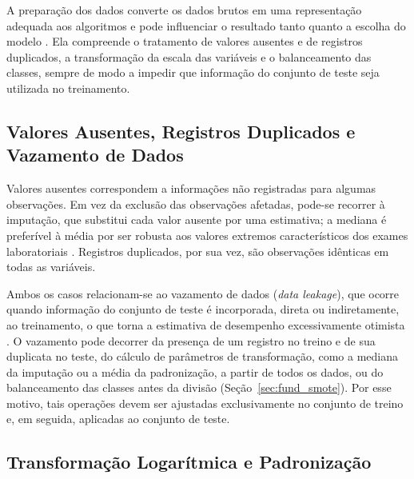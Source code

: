 A preparação dos dados converte os dados brutos em uma representação adequada aos algoritmos e pode influenciar o resultado tanto quanto a escolha do modelo \cite{KAPOOR2023100804}. Ela compreende o tratamento de valores ausentes e de registros duplicados, a transformação da escala das variáveis e o balanceamento das classes, sempre de modo a impedir que informação do conjunto de teste seja utilizada no treinamento.

\subsection{Valores Ausentes, Registros Duplicados e Vazamento de Dados}
\label{sec:fund_ausentes}
\label{sec:fund_vazamento}

Valores ausentes correspondem a informações não registradas para algumas observações. Em vez da exclusão das observações afetadas, pode-se recorrer à imputação, que substitui cada valor ausente por uma estimativa; a mediana é preferível à média por ser robusta aos valores extremos característicos dos exames laboratoriais \cite{batistamonard2003}. Registros duplicados, por sua vez, são observações idênticas em todas as variáveis.

Ambos os casos relacionam-se ao vazamento de dados (\textit{data leakage}), que ocorre quando informação do conjunto de teste é incorporada, direta ou indiretamente, ao treinamento, o que torna a estimativa de desempenho excessivamente otimista \cite{KaufmanScharRosset2012, KAPOOR2023100804}. O vazamento pode decorrer da presença de um registro no treino e de sua duplicata no teste, do cálculo de parâmetros de transformação, como a mediana da imputação ou a média da padronização, a partir de todos os dados, ou do balanceamento das classes antes da divisão (Seção~\ref{sec:fund_smote}). Por esse motivo, tais operações devem ser ajustadas exclusivamente no conjunto de treino e, em seguida, aplicadas ao conjunto de teste.

\subsection{Transformação Logarítmica e Padronização}
\label{sec:fund_log}
\label{sec:fund_padronizacao}

